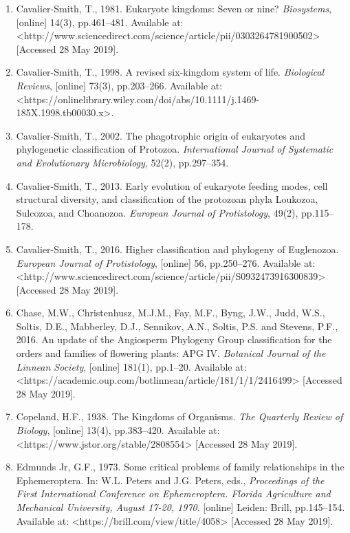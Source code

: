 \documentclass[a4paper]{article}
\begin{document}
\begin{enumerate}
.
\item Cavalier-Smith, T., 1981. Eukaryote kingdoms: Seven or nine? \textit{Biosystems}, [online] 14(3), pp.461–481.
Available at: {\textless}http://www.sciencedirect.com/science/article/pii/0303264781900502{\textgreater} [Accessed 28
May 2019].
\item Cavalier-Smith, T., 1998. A revised six-kingdom system of life. \textit{Biological Reviews}, [online] 73(3),
pp.203–266. Available at:
{\textless}https://onlinelibrary.wiley.com/doi/abs/10.1111/j.1469-185X.1998.tb00030.x{\textgreater}.
\item Cavalier-Smith, T., 2002. The phagotrophic origin of eukaryotes and phylogenetic classification of Protozoa.
\textit{International Journal of Systematic and Evolutionary Microbiology}, 52(2), pp.297–354.
\item Cavalier-Smith, T., 2013. Early evolution of eukaryote feeding modes, cell structural diversity, and
classification of the protozoan phyla Loukozoa, Sulcozoa, and Choanozoa. \textit{European Journal of Protistology},
49(2), pp.115–178.
\item Cavalier-Smith, T., 2016. Higher classification and phylogeny of Euglenozoa. \textit{European Journal of
Protistology}, [online] 56, pp.250–276. Available at:
{\textless}http://www.sciencedirect.com/science/article/pii/S0932473916300839{\textgreater} [Accessed 28 May 2019].
\item Chase, M.W., Christenhusz, M.J.M., Fay, M.F., Byng, J.W., Judd, W.S., Soltis, D.E., Mabberley, D.J., Sennikov,
A.N., Soltis, P.S. and Stevens, P.F., 2016. An update of the Angiosperm Phylogeny Group classification for the orders
and families of flowering plants: APG IV. \textit{Botanical Journal of the Linnean Society}, [online] 181(1), pp.1–20.
Available at: {\textless}https://academic.oup.com/botlinnean/article/181/1/1/2416499{\textgreater} [Accessed 28 May
2019].
\item Copeland, H.F., 1938. The Kingdoms of Organisms. \textit{The Quarterly Review of Biology}, [online] 13(4),
pp.383–420. Available at: {\textless}https://www.jstor.org/stable/2808554{\textgreater} [Accessed 28 May 2019].
\item Edmunds Jr, G.F., 1973. Some critical problems of family relationships in the Ephemeroptera. In: W.L. Peters and
J.G. Peters, eds., \textit{Proceedings of the First International Conference on Ephemeroptera. Florida Agriculture and
Mechanical University, August 17-20, 1970}. [online] Leiden: Brill, pp.145–154. Available at:
{\textless}https://brill.com/view/title/4058{\textgreater} [Accessed 28 May 2019].

\end{enumerate}
\end{document}
